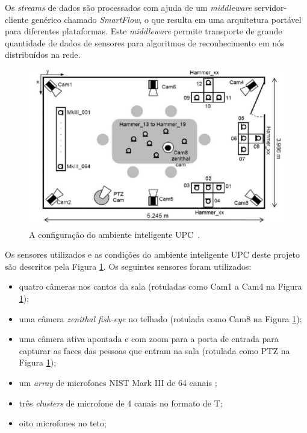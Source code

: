 Os \textit{streams} de dados são processados com ajuda de um \textit{middleware} servidor-cliente genérico chamado \textit{SmartFlow}, o que resulta em uma arquitetura portável para diferentes plataformas. Este \textit{middleware} permite transporte de grande quantidade de dados de sensores para algoritmos de reconhecimento em nós distribuídos na rede.

	\begin{figure}[hbt]
		\begin{center}
			\includegraphics[scale=0.4]{figuras/3.TrabalhosCorrelatos/upc.png}
		\end{center}
		\caption{A configuração do ambiente inteligente UPC~\cite{salah}.}
		\label{upc}
	\end{figure}

Os sensores utilizados e as condições do ambiente inteligente UPC deste projeto são descritos pela Figura \ref{upc}. Os seguintes sensores foram utilizados:

	\begin{itemize}
		\item quatro câmeras nos cantos da sala (rotuladas como Cam1 a Cam4 na Figura \ref{upc});
		\item uma câmera \textit{zenithal fish-eye} no telhado (rotulada como Cam8 na Figura \ref{upc});
		\item uma câmera ativa apontada e com zoom para a porta de entrada para capturar as faces das pessoas que entram na sala (rotulada como PTZ na Figura \ref{upc});
		\item um \textit{array} de microfones NIST Mark III de 64 canais ;
		\item três \textit{clusters} de microfone de 4 canais no formato de T;
		\item oito microfones no teto;
	\end{itemize}


